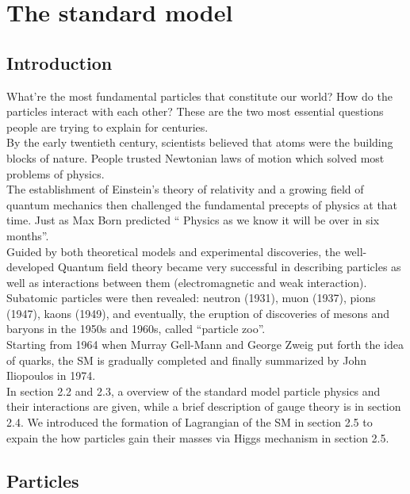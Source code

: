 \chapter{The standard model}
\label{ch:sm}
\section{Introduction}

What're the most fundamental particles that constitute our world? How do the particles interact with each other? These are the two most essential questions people are trying to explain for centuries. \\
By the early twentieth century, scientists believed that atoms were the building blocks of nature. People trusted Newtonian laws of motion which solved most problems of physics. \\
The establishment of Einstein's theory of relativity and a growing field of quantum mechanics then 
challenged the fundamental precepts of physics at that time. Just as Max Born predicted `` Physics as we know it will be over in six months''.	\\		 
Guided by both theoretical models and experimental discoveries, the well-developed Quantum field theory became very successful in describing particles as well as 
interactions between them (electromagnetic and weak interaction). Subatomic particles were then revealed: neutron (1931), muon (1937), pions (1947), kaons (1949), and eventually, the eruption of discoveries of mesons and baryons in the 1950s and 1960s, called ``particle zoo''. \\
Starting from 1964 when Murray Gell-Mann and George Zweig put forth the idea of quarks, 
the SM is gradually completed and finally summarized by John Iliopoulos in 1974.\\
In section 2.2 and 2.3, a overview of the standard model particle physics and their interactions are given, while
a brief description of gauge theory is in section 2.4. We introduced the formation of Lagrangian of the SM in section 2.5 to expain the how particles gain their
masses via Higgs mechanism in section 2.5.

\section{Particles}


